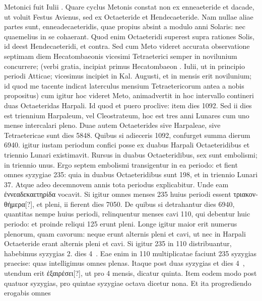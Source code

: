 Metonici fuit Iulii .
Quare cyclus Metonis constat
non ex enneaeteride et dacade, ut voluit Festus Avienus, sed ex Octaeteride
et Hendecaeteride.
Nam nullae aliae partes sunt, enneadecaeteridis,
quae propius absint a modulo anni Solaris: nec quaemelius
in se cohaerant.
Quod enim Octaeteridi superest supra rationes
Solis, id deest Hendecaeteridi, et contra.
Sed cum Meto videret
accurata observatione septimam diem Hecatombaeonis vicesimi
Tetraeterici semper in novilunium concurrere; (verbi gratia, incipiat
primus Hecatombaeon . Iulii, ut in principio periodi Atticae;
vicesimus incipiet in Kal. Augusti, et in  mensis erit novilunium;
id quod me tacente indicat laterculus mensium Tetraetericorum
antea a nobis propositus) cum igitur hoc videret Meto, animadvertit
in hoc intervallo contineri duas Octaeteridas Harpali.
Id
quod et puero proclive: item dies 1092.
Sed ii dies est triennium Harpaleum,
vel Cleostrateum, hoc est tres anni Lunares cum uno mense
intercalari pleno.
Duae autem Octaeterides sive Harpaleae, sive Tetraetericae
sunt dies 5848.
Quibus si adieceris 1092, confurget summa
dierum 6940.
igitur iustam periodum confici posse ex duabus
Harpali Octaeteridibus et triennio Lunari existimavit.
%
Rursus in
duabus Octaeteridibus, sex sunt embolismi; in triennio unus.
Ergo septem embolismi transigentur in ea periodo: et fient omnes
syzygiae 235: quia in duabus Octaeteridibus sunt 198, et in triennio
Lunari 37.
Atque adeo decemnovem annis tota periodus explicabitur.
Unde eam \textgreek{ἐννεαδεκαετηρίδα} vocavit.
Si igitur omnes
menses 235 huius periodi essent \textgreek{τριακονθήμερα[?]},
 et pleni, ii fierent
dies 7050.
De quibus si detrahantur dies 6940, quantitas nempe
huius periodi, relinquentur menses cavi 110, qui debentur
huic periodo: et proinde reliqui 125 erunt pleni.
Longe igitur
maior erit numerus plenorum, quam cavorum: neque erunt
alternis pleni et cavi, ut nec in Harpali Octaeteride erant alternis
pleni et cavi.
Si igitur 235 in 110 distribuantur, habebimus syzygias
2. dies 4~.
Eae enim in 110 multiplicatae faciunt 235 syzygias
praecise: quas intelligimus omnes plenas.
Itaque post duas
syzygias et dies 4~, utendum erit \textgreek{ἐξαιρέσει[?]},
 ut pro 4 mensis, dicatur
quinta.
Item eodem modo post quatuor syzygias, pro quintae
syzygiae octava dicetur nona.
Et ita progrediendo erogabis omnes
